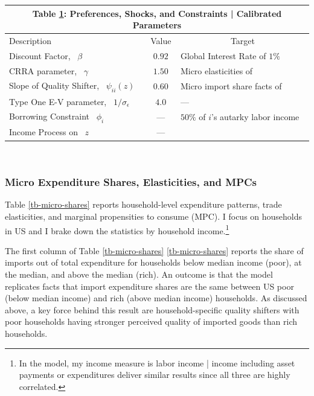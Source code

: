\documentclass[12pt,pdftex]{article}
\renewcommand{\arraystretch}{1.1}
\begin{document}
\begin{onehalfspacing}
\begin{table}[t]
\small
\begin{center}
\setlength {\tabcolsep}{5.5mm}
\renewcommand{\arraystretch}{1.60}\label{tb-calibration}
\begin{tabular}[t]{l c l}
\multicolumn{3}{c}{{\normalsize\textbf{Table \ref{tb-calibration}: Preferences, Shocks, and Constraints | Calibrated Parameters}} }
\\\hline \hline
Description & Value & \multicolumn{1}{c}{Target}\\
\cmidrule(lr){1-1} \cmidrule(lr){2-2} \cmidrule(lr){3-3}
Discount Factor, \ $\beta$                          & $0.92$ & Global Interest Rate of $1\%$ \\
CRRA parameter, \ $\gamma$                          & $1.50$ & Micro elasticities of \citet{auer2022unequal} \\
Slope of Quality Shifter, \ $\psi_{ii}(z)$          & $0.60$ & Micro import share facts of \citet{borusyak2021distributional} \\
Type One E-V parameter, \ $1 / \sigma_{\epsilon}$    & $4.0$ & --- \\
Borrowing Constraint \ $\phi_{i}$                   & --- & $50\%$ of $i$'s autarky labor income \\
Income Process on \ $z$                             & --- & \citet{krueger2016macroeconomics} \\
\hline
\end{tabular}
\\[0.5ex]
\end{center}
\end{table}

\subsubsection{Micro Expenditure Shares, Elasticities, and MPCs}

Table \ref{tb-micro-shares} reports household-level expenditure patterns, trade elasticities, and marginal propensities to consume (MPC). I focus on households in US and I brake down the statistics by household income.\footnote{In the model, my income measure is labor income | income including asset payments or expenditures deliver similar results since all three are highly correlated.}

The first column of Table \ref{tb-micro-shares} \ref{tb-micro-shares} reports the share of imports out of total expenditure for households below median income (poor), at the median, and above the median (rich). An outcome is that the model replicates \citet{borusyak2021distributional} facts that import expenditure shares are the same between US poor (below median income) and rich (above median income) households. As discussed above, a key force behind this result are household-specific quality shifters with poor households having stronger perceived quality of imported goods than rich households.


\end{onehalfspacing}
\end{document}

